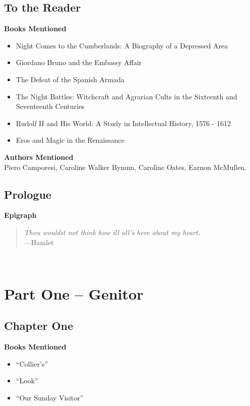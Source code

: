 \documentclass[12pt,makeidx]{extreport}
\newcommand\fleuron{\begin{turn}{45}\Large \ding{166}\end{turn}}
\newcommand\doublefleuron{%
	\reflectbox{\fleuron}\AC\staveXLIX\reflectbox{\AC}\fleuron}
\newcommand\fleuronbar{%
	{\huge\LinearACCCXIII}\xrfill[1.3ex]{1pt}\doublefleuron\xrfill[1.3ex]{1pt}\reflectbox{\huge\LinearACCCXIII}}
\newcommand\nbvspace[1][3]{\vspace*{\stretch{#1}}}
\begin{document}
\section{To the Reader}
\textbf{Books Mentioned}
\begin{itemize}
\item Night Comes to the Cumberlands: A Biography of a Depressed Area \cite{Caudill1963}
\item Giordano Bruno and the Embassy Affair \cite{Bossy1991}
\item The Defeat of the Spanish Armada \cite{Mattingly1969}
\item The Night Battles: Witchcraft and Agrarian Cults in the Sixteenth and Seventeenth Centuries \cite{Ginzburg1985}
\item Rudolf II and His World: A Study in Intellectual History, 1576 - 1612 \cite{Evans1973}
\item Eros and Magic in the Renaissance \cite{Culianu1987}
\end{itemize}



\textbf{Authors Mentioned}\\
Piero Camporesi, Caroline Walker Bynum, Caroline Oates, Earnon McMullen.
\\


\section{Prologue}
\textbf{Epigraph}

\begin{quote}
\textit{Thou wouldst not think how ill all's here about my heart.}\\
---Hamlet
\end{quote}
\begin{center}
\vfill
\shadowoffset{1pt}
\shadowtext{%
{\color{Mahogany}\fontsize{50}{54}\Jupiter}}\\
\nbvspace[1]
\end{center}

\chapter{Part One -- Genitor}
\section{Chapter One}
\textbf{Books Mentioned}\\
\begin{itemize}
\item ``Collier’s'' \cite{1952b}
\item ``Look'' \cite{1952}
\item ``Our Sunday Visitor'' \cite{1952a}
\end{itemize}
\end{document}
